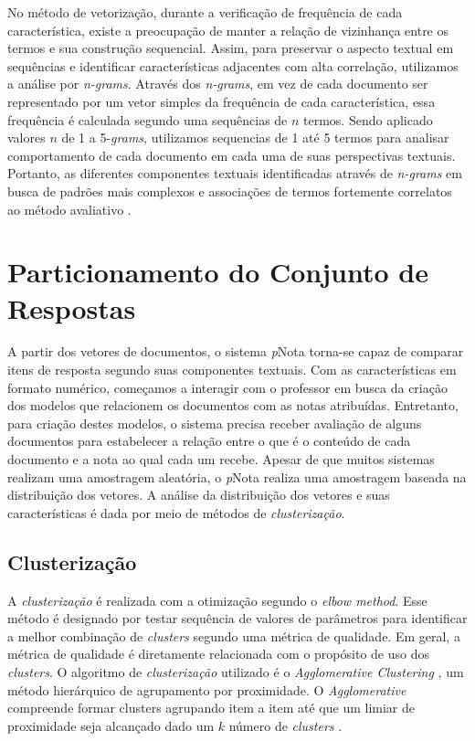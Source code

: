No método de vetorização, durante a verificação de frequência de cada característica, existe a preocupação de manter a relação de vizinhança entre os termos e sua construção sequencial. Assim, para preservar o aspecto textual em sequências e identificar características adjacentes com alta correlação, utilizamos a análise por \textit{n-grams}. Através dos \textit{n-grams}, em vez de cada documento ser representado por um vetor simples da frequência de cada característica, essa frequência é calculada segundo uma sequências de $ n $ termos. Sendo aplicado valores $ n $ de 1 a 5-\textit{grams}, utilizamos sequencias de 1 até 5 termos para analisar comportamento de cada documento em cada uma de suas perspectivas textuais. Portanto, as diferentes componentes textuais identificadas através de \textit{n-grams} em busca de padrões mais complexos e associações de termos fortemente correlatos ao método avaliativo \cite{spalenza2020}.

\section{Particionamento do Conjunto de Respostas}

A partir dos vetores de documentos, o sistema \textit{p}Nota torna-se capaz de comparar itens de resposta segundo suas componentes textuais. Com as características em formato numérico, começamos a interagir com o professor em busca da criação dos modelos que relacionem os documentos com as notas atribuídas. Entretanto, para criação destes modelos, o sistema precisa receber avaliação de alguns documentos para estabelecer a relação entre o que é o conteúdo de cada documento e a nota ao qual cada um recebe. Apesar de que muitos sistemas realizam uma amostragem aleatória, o \textit{p}Nota realiza uma amostragem baseada na distribuição dos vetores. A análise da distribuição dos vetores e suas características é dada por meio de métodos de \textit{clusterização}.

\subsection{Clusterização}

A \textit{clusterização} é realizada com a otimização segundo o \textit{elbow method}. Esse método é designado por testar sequência de valores de parâmetros para identificar a melhor combinação de \textit{clusters} segundo uma métrica de qualidade. Em geral, a métrica de qualidade é diretamente relacionada com o propósito de uso dos \textit{clusters}. O algoritmo de \textit{clusterização} utilizado é o \textit{Agglomerative Clustering} \cite{spalenza2019}, um método hierárquico de agrupamento por proximidade. O \textit{Agglomerative} compreende formar clusters agrupando item a item até que um limiar de proximidade seja alcançado dado um $ k $ número de \textit{clusters} \cite{everitt2011}.


